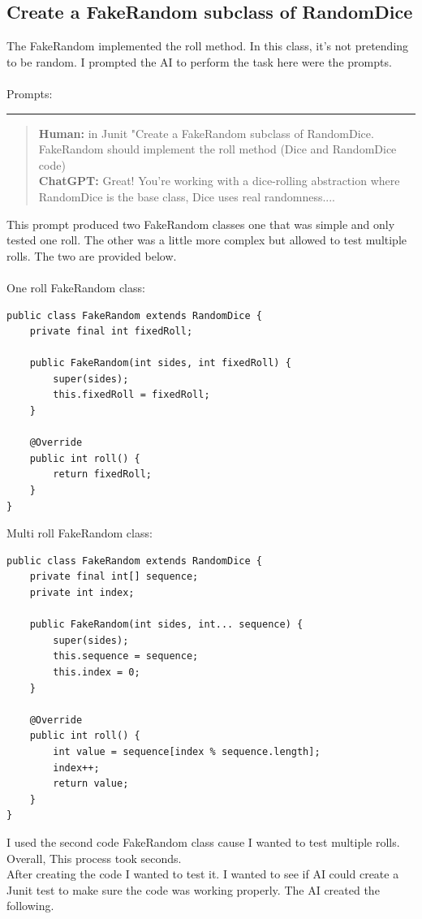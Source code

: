 \documentclass[a4paper,11pt]{article}
\begin{document}
\subsection*{Create a FakeRandom subclass of RandomDice}
The FakeRandom implemented the roll method. In this class, it's not pretending to be random. I prompted the AI to perform the task here were the prompts.\\\\
Prompts:
\hrule
\vspace{4pt} %
\begin{quote}
\textbf{Human:} in Junit "Create a FakeRandom subclass of RandomDice. FakeRandom should implement the roll method (Dice and RandomDice code)\\
\textbf{ChatGPT:} Great! You’re working with a dice-rolling abstraction where RandomDice is the base class, Dice uses real randomness....
\end{quote}
This prompt produced two FakeRandom classes one that was simple and only tested one roll. The other was a little more complex but allowed to test multiple rolls. The two are provided below. \\\\
One roll FakeRandom class:
\begin{lstlisting}
public class FakeRandom extends RandomDice {
    private final int fixedRoll;

    public FakeRandom(int sides, int fixedRoll) {
        super(sides);
        this.fixedRoll = fixedRoll;
    }

    @Override
    public int roll() {
        return fixedRoll;
    }
}
\end{lstlisting}
Multi roll FakeRandom class:
\begin{lstlisting}
public class FakeRandom extends RandomDice {
    private final int[] sequence;
    private int index;

    public FakeRandom(int sides, int... sequence) {
        super(sides);
        this.sequence = sequence;
        this.index = 0;
    }

    @Override
    public int roll() {
        int value = sequence[index % sequence.length];
        index++;
        return value;
    }
}
\end{lstlisting}
I used the second code FakeRandom class cause I wanted to test multiple rolls. Overall, This process took seconds.\\
After creating the code I wanted to test it. I wanted to see if AI could create a Junit test to make sure the code was working properly. The AI created the following.  
\end{document}
